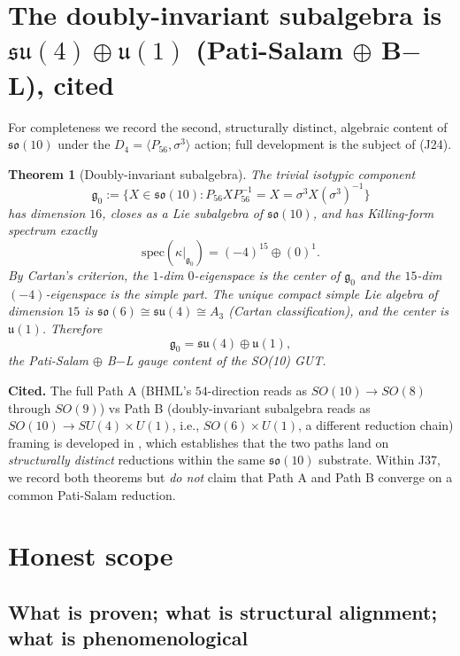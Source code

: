\documentclass[11pt,reqno]{amsart}
\newtheorem{theorem}{Theorem}[section]
\theoremstyle{definition}
\newcommand{\so}{\mathfrak{so}}
\newcommand{\su}{\mathfrak{su}}
\newcommand{\uone}{\mathfrak{u}}
\newcommand{\Psix}{P_{56}}
\begin{document}
\section{The doubly-invariant subalgebra is $\su(4) \oplus \uone(1)$
(Pati-Salam $\oplus$ B$-$L), cited}
\label{sec:doubly-invariant}

For completeness we record the second, structurally distinct,
algebraic content of $\so(10)$ under the $D_4 = \langle \Psix,
\sigma^3 \rangle$ action; full development is the subject of
\cite{Sanders2026PathAPathB} (J24).

\begin{theorem}[Doubly-invariant subalgebra]
\label{thm:doubly-invariant}
The trivial isotypic component
\[
  \mathfrak{g}_0 := \{X \in \so(10) : \Psix X \Psix^{-1} = X
  = \sigma^3 X (\sigma^3)^{-1}\}
\]
has dimension $16$, closes as a Lie subalgebra of $\so(10)$, and
has Killing-form spectrum exactly
\[
  \mathrm{spec}(\kappa\big|_{\mathfrak{g}_0})
  = (-4)^{15} \oplus (0)^1.
\]
By Cartan's criterion, the $1$-dim $0$-eigenspace is the center of
$\mathfrak{g}_0$ and the $15$-dim $(-4)$-eigenspace is the simple
part. The unique compact simple Lie algebra of dimension $15$ is
$\so(6) \cong \su(4) \cong A_3$ (Cartan classification), and the
center is $\uone(1)$. Therefore
\[
  \mathfrak{g}_0 = \su(4) \oplus \uone(1),
\]
the Pati-Salam $\oplus$ B$-$L gauge content of the SO(10) GUT.
\end{theorem}

\noindent\textbf{Cited.} The full Path A (BHML's $54$-direction
reads as $SO(10) \to SO(8)$ through $SO(9)$) vs Path B
(doubly-invariant subalgebra reads as $SO(10) \to SU(4) \times U(1)$,
i.e., $SO(6) \times U(1)$, a different reduction chain) framing is
developed in \cite{Sanders2026PathAPathB}, which establishes that
the two paths land on \emph{structurally distinct} reductions
within the same $\so(10)$ substrate. Within J37, we record both
theorems but \emph{do not} claim that Path A and Path B converge on
a common Pati-Salam reduction.

\section{Honest scope}
\label{sec:scope}

\subsection{What is proven; what is structural alignment; what is
phenomenological}
\end{document}
